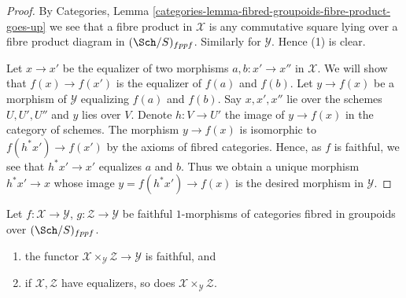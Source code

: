 \begin{proof}
By
Categories, Lemma \ref{categories-lemma-fibred-groupoids-fibre-product-goes-up}
we see that a fibre product in $\mathcal{X}$ is any commutative square lying
over a fibre product diagram in $(\Sch/S)_{fppf}$. Similarly for
$\mathcal{Y}$. Hence (1) is clear.

\medskip\noindent
Let $x \to x'$ be the equalizer of two morphisms $a, b : x' \to x''$
in $\mathcal{X}$. We will show that $f(x) \to f(x')$ is the equalizer
of $f(a)$ and $f(b)$. Let $y \to f(x)$ be a morphism of $\mathcal{Y}$
equalizing $f(a)$ and $f(b)$. Say $x, x', x''$ lie over the schemes
$U, U', U''$ and $y$ lies over $V$. Denote $h : V \to U'$ the image
of $y \to f(x)$ in the category of schemes. The morphism
$y \to f(x)$ is isomorphic to $f(h^*x') \to f(x')$ by the axioms of
fibred categories. Hence, as $f$ is faithful, we see that
$h^*x' \to x'$ equalizes $a$ and $b$. Thus we obtain a unique morphism
$h^*x' \to x$ whose image $y = f(h^*x') \to f(x)$ is the desired morphism
in $\mathcal{Y}$.
\end{proof}

\begin{lemma}
\label{lemma-fibre-products-preserve-properties}
Let $f : \mathcal{X} \to \mathcal{Y}$, $g : \mathcal{Z} \to \mathcal{Y}$
be faithful $1$-morphisms of categories
fibred in groupoids over $(\Sch/S)_{fppf}$.
\begin{enumerate}
\item the functor $\mathcal{X} \times_\mathcal{Y} \mathcal{Z} \to \mathcal{Y}$
is faithful, and
\item if $\mathcal{X}, \mathcal{Z}$ have equalizers, so does
$\mathcal{X} \times_\mathcal{Y} \mathcal{Z}$.
\end{enumerate}
\end{lemma}

